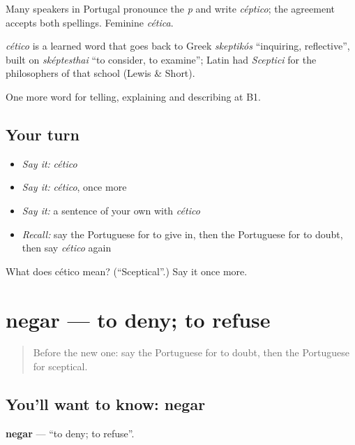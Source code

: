 Many speakers in Portugal pronounce the \emph{p} and write \emph{céptico}; the agreement accepts both spellings. Feminine \emph{cética}.

\begin{cousinweb}
\emph{cético} is a learned word that goes back to Greek \emph{skeptikós} \textquotedblleft{}inquiring, reflective\textquotedblright{}, built on \emph{sképtesthai} \textquotedblleft{}to consider, to examine\textquotedblright{}; Latin had \emph{Sceptici} for the philosophers of that school (Lewis \& Short).
\end{cousinweb}

\begin{grammarlens}[title={What you've built}]
One more word for telling, explaining and describing at B1.
\end{grammarlens}

\subsection*{Your turn}
\begin{itemize}
\raggedright
  \item \emph{Say it:} \emph{cético}
  \item \emph{Say it:} \emph{cético}, once more
  \item \emph{Say it:} a sentence of your own with \emph{cético}
  \item \emph{Recall:} say the Portuguese for to give in, then the Portuguese for to doubt, then say \emph{cético} again
\end{itemize}

\begin{tcolorbox}[breakable,colback=teal!4,colframe=teal!35!black,title={Before you move on}]
What does cético mean? (\textquotedblleft{}Sceptical\textquotedblright{}.) Say it once more.
\end{tcolorbox}
\section[negar]{negar — to deny; to refuse}

\label{lesson:PT-C340-negar}



\begin{quote}
Before the new one: say the Portuguese for to doubt, then the Portuguese for sceptical.
\end{quote}

\subsection*{You'll want to know: negar}
\textbf{negar} — \textquotedblleft{}to deny; to refuse\textquotedblright{}.

